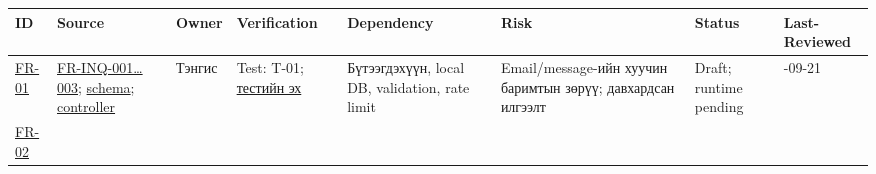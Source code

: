 \documentclass[
  11pt,
  a4paper,
]{article}
\begin{document}
\begin{longtable}[]{@{}
  >{\raggedright\arraybackslash}p{}
  >{\raggedright\arraybackslash}p{}
  >{\raggedright\arraybackslash}p{}
  >{\raggedright\arraybackslash}p{}
  >{\raggedright\arraybackslash}p{}
  >{\raggedright\arraybackslash}p{}
  >{\raggedright\arraybackslash}p{}
  >{\raggedright\arraybackslash}p{}@{}}
\toprule\noalign{}
\begin{minipage}[b]{\linewidth}\raggedright
ID
\end{minipage} & \begin{minipage}[b]{\linewidth}\raggedright
Source
\end{minipage} & \begin{minipage}[b]{\linewidth}\raggedright
Owner
\end{minipage} & \begin{minipage}[b]{\linewidth}\raggedright
Verification
\end{minipage} & \begin{minipage}[b]{\linewidth}\raggedright
Dependency
\end{minipage} & \begin{minipage}[b]{\linewidth}\raggedright
Risk
\end{minipage} & \begin{minipage}[b]{\linewidth}\raggedright
Status
\end{minipage} & \begin{minipage}[b]{\linewidth}\raggedright
Last-Reviewed
\end{minipage} \\
\midrule\noalign{}
\endhead
\bottomrule\noalign{}
\endlastfoot
\href{../../requirements/requirements.md\#fr-01}{FR-01} &
\href{../../phase-0/02-requirements.md}{FR-INQ-001\ldots003};
\href{../../../packages/validation-schemas/src/inquiry.schema.ts}{schema};
\href{../../../backend/api/src/controllers/inquiry.controller.ts}{controller}
& Тэнгис & Test: T-01;
\href{../../../backend/api/tests/inquiry-cart.integration.test.ts}{тестийн
эх} & Бүтээгдэхүүн, local DB, validation, rate limit & Email/message-ийн
хуучин баримтын зөрүү; давхардсан илгээлт & Draft; runtime pending &
2026-09-21 \\
\href{../../requirements/requirements.md\#fr-02}{FR-02} &

\end{longtable}
\end{document}
